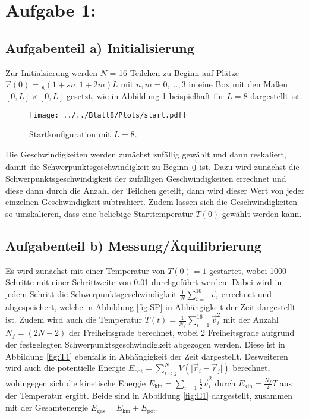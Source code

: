\section*{Aufgabe 1: }

\subsection*{Aufgabenteil a) Initialisierung}

Zur Initialsierung werden $N$ = 16 Teilchen zu Beginn auf Plätze
$\vec{r}(0)=\frac{1}{8}(1+sn,1+2m)L$ mit $n,m=0,...,3$ in eine Box mit den Maßen
$[0,L]\times[0,L]$ gesetzt, wie in Abbildung \ref{fig:start} beispielhaft für $L=8$ dargestellt ist.

\begin{figure}[H]
\texttt{[image: ../../Blatt8/Plots/start.pdf]}
\caption{Startkonfiguration mit $L=8$.}
\label{fig:start}
\end{figure}

Die Geschwindigkeiten werden zunächst zufällig gewählt und dann reskaliert, damit die Schwerpunktsgeschwindigkeit
zu Beginn $\vec{0}$ ist. Dazu wird zunächst die Schwerpunktsgeschwindigkeit der zufälligen Geschwindigkeiten errechnet und diese dann durch die Anzahl der Teilchen geteilt, dann wird dieser Wert von jeder einzelnen Geschwindigkeit subtrahiert.
Zudem lassen sich die Geschwindigkeiten so umskalieren, dass eine beliebige Starttemperatur $T(0)$ gewählt werden kann.

\subsection*{Aufgabenteil b) Messung/Äquilibrierung}

Es wird zunächst mit einer Temperatur von $T(0)=1$ gestartet, wobei 1000 Schritte mit einer Schrittweite von 0.01
durchgeführt werden. Dabei wird in jedem Schritt die Schwerpunktsgeschwindigkeit $\frac{1}{N}\sum_{i=1}^{16}\vec{v}_i$ errechnet und abgespeichert, welche in Abbildung \ref{fig:SP} in Abhängigkeit der Zeit dargestellt ist.
Zudem wird auch die Temperatur $T(t)=\frac{1}{N_f}\sum_{i=1}^{16}\vec{v}_i^2$  mit der Anzahl $N_f=(2N-2)$ der Freiheitsgrade berechnet, wobei 2 Freiheitsgrade aufgrund der festgelegten Schwerpunktsgeschwindigkeit abgezogen werden. Diese ist in Abbildung \ref{fig:T1} ebenfalls in Abhängigkeit der Zeit dargestellt. Desweiteren wird auch die potentielle Energie
$E_{\text{pot}}=\sum_{i<j}^N V(\lvert \vec{r}_i - \vec{r}_j \rvert)$ berechnet, wohingegen sich die kinetische Energie
$E_{\text{kin}}=\sum_{i=1}\frac{1}{2} \vec{v}_i^2$ durch $E_{\text{kin}}=\frac{N_f}{2}T$
aus der Temperatur ergibt. Beide sind in Abbildung \ref{fig:E1} dargestellt,
zusammen mit der Gesamtenergie $E_{\text{ges}}=E_{\text{kin}}+E_{\text{pot}}$.

